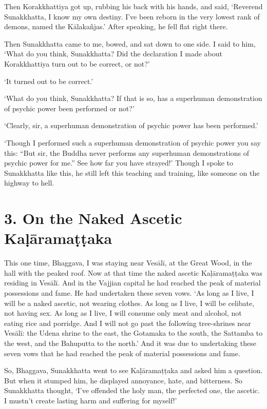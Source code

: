 \documentclass[12pt,openany]{book}%
\begin{document}
Then Korakkhattiya got up, rubbing his back with his hands, and said, ‘Reverend Sunakkhatta, I know my own destiny. I’ve been reborn in the very lowest rank of demons, named the \textsanskrit{Kālakañjas}.’ After speaking, he fell flat right there. 

Then Sunakkhatta came to me, bowed, and sat down to one side. I said to him, ‘What do you think, Sunakkhatta? Did the declaration I made about Korakkhattiya turn out to be correct, or not?’ 

‘It turned out to be correct.’ 

‘What do you think, Sunakkhatta? If that is so, has a superhuman demonstration of psychic power been performed or not?’ 

‘Clearly, sir, a superhuman demonstration of psychic power has been performed.’ 

‘Though I performed such a superhuman demonstration of psychic power you say this: “But sir, the Buddha never performs any superhuman demonstrations of psychic power for me.” See how far you have strayed!’ Though I spoke to Sunakkhatta like this, he still left this teaching and training, like someone on the highway to hell. 

\section*{3. On the Naked Ascetic \textsanskrit{Kaḷāramaṭṭaka} }

This one time, Bhaggava, I was staying near \textsanskrit{Vesālī}, at the Great Wood, in the hall with the peaked roof. Now at that time the naked ascetic \textsanskrit{Kaḷāramaṭṭaka} was residing in \textsanskrit{Vesālī}. And in the Vajjian capital he had reached the peak of material possessions and fame. He had undertaken these seven vows. ‘As long as I live, I will be a naked ascetic, not wearing clothes. As long as I live, I will be celibate, not having sex. As long as I live, I will consume only meat and alcohol, not eating rice and porridge. And I will not go past the following tree-shrines near \textsanskrit{Vesālī}: the Udena shrine to the east, the Gotamaka to the south, the Sattamba to the west, and the Bahuputta to the north.’ And it was due to undertaking these seven vows that he had reached the peak of material possessions and fame. 

So, Bhaggava, Sunakkhatta went to see \textsanskrit{Kaḷāramaṭṭaka} and asked him a question. But when it stumped him, he displayed annoyance, hate, and bitterness. So Sunakkhatta thought, ‘I’ve offended the holy man, the perfected one, the ascetic. I mustn’t create lasting harm and suffering for myself!’ 
\end{document}

